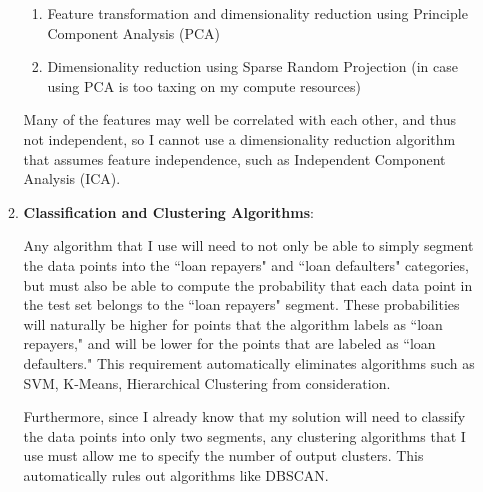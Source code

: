 \documentclass[12pt, letterpaper]{article}
\begin{document}
\begin{enumerate}
\begin{enumerate}
        \begin{enumerate}
          \item Feature transformation and dimensionality reduction using Principle Component Analysis (PCA)
          \item Dimensionality reduction using Sparse Random Projection (in case using PCA is too taxing on my compute resources)
        \end{enumerate}
        Many of the features may well be correlated with each other, and thus not independent, so I cannot use a dimensionality reduction algorithm that assumes feature independence, such as Independent Component Analysis (ICA).
      \item \textbf{Classification and Clustering Algorithms}:

      Any algorithm that I use will need to not only be able to simply segment the data points into the ``loan repayers" and ``loan defaulters" categories, but must also be able to compute the probability that each data point in the test set belongs to the ``loan repayers" segment. These probabilities will naturally be higher for points that the algorithm labels as ``loan repayers," and will be lower for the points that are labeled as ``loan defaulters." This requirement automatically eliminates algorithms such as SVM, K-Means, Hierarchical Clustering from consideration.

      Furthermore, since I already know that my solution will need to classify the data points into only two segments, any clustering algorithms that I use must allow me to specify the number of output clusters. This automatically rules out algorithms like DBSCAN.


\end{enumerate}
\end{enumerate}
\end{document}
